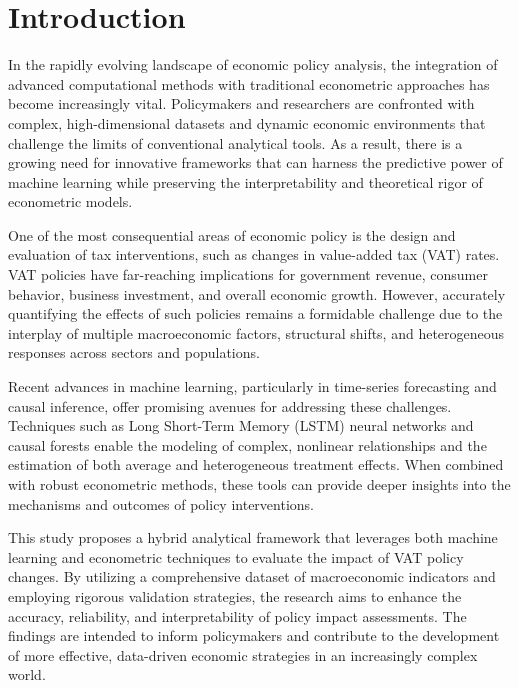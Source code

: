 \section{Introduction}


In the rapidly evolving landscape of economic policy analysis, the integration of advanced computational methods with traditional econometric approaches has become increasingly vital. Policymakers and researchers are confronted with complex, high-dimensional datasets and dynamic economic environments that challenge the limits of conventional analytical tools. As a result, there is a growing need for innovative frameworks that can harness the predictive power of machine learning while preserving the interpretability and theoretical rigor of econometric models.

One of the most consequential areas of economic policy is the design and evaluation of tax interventions, such as changes in value-added tax (VAT) rates. VAT policies have far-reaching implications for government revenue, consumer behavior, business investment, and overall economic growth. However, accurately quantifying the effects of such policies remains a formidable challenge due to the interplay of multiple macroeconomic factors, structural shifts, and heterogeneous responses across sectors and populations.

Recent advances in machine learning, particularly in time-series forecasting and causal inference, offer promising avenues for addressing these challenges. Techniques such as Long Short-Term Memory (LSTM) neural networks and causal forests enable the modeling of complex, nonlinear relationships and the estimation of both average and heterogeneous treatment effects. When combined with robust econometric methods, these tools can provide deeper insights into the mechanisms and outcomes of policy interventions.

This study proposes a hybrid analytical framework that leverages both machine learning and econometric techniques to evaluate the impact of VAT policy changes. By utilizing a comprehensive dataset of macroeconomic indicators and employing rigorous validation strategies, the research aims to enhance the accuracy, reliability, and interpretability of policy impact assessments. The findings are intended to inform policymakers and contribute to the development of more effective, data-driven economic strategies in an increasingly complex world.


